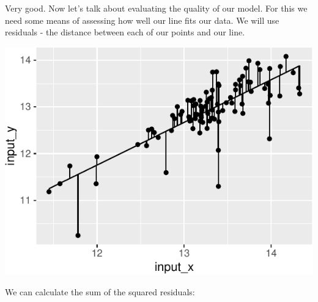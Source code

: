 \documentclass[
]{krantz}
\newenvironment{Shaded}{\begin{snugshade}}{\end{snugshade}}
\newcommand{\AttributeTok}[1]{\textcolor[rgb]{0.77,0.63,0.00}{#1}}
\newcommand{\ConstantTok}[1]{\textcolor[rgb]{0.00,0.00,0.00}{#1}}
\newcommand{\DecValTok}[1]{\textcolor[rgb]{0.00,0.00,0.81}{#1}}
\newcommand{\DocumentationTok}[1]{\textcolor[rgb]{0.56,0.35,0.01}{\textbf{\textit{#1}}}}
\newcommand{\FunctionTok}[1]{\textcolor[rgb]{0.00,0.00,0.00}{#1}}
\newcommand{\NormalTok}[1]{#1}
\newcommand{\SpecialCharTok}[1]{\textcolor[rgb]{0.00,0.00,0.00}{#1}}
\begin{document}
Very good. Now let's talk about evaluating the quality of our model. For this we need some means of assessing how well our line fits our data. We will use residuals - the distance between each of our points and our line.

\begin{Shaded}
\end{Shaded}

\begin{center}\includegraphics[width=0.8\linewidth]{index_files/figure-latex/unnamed-chunk-125-1} \end{center}

We can calculate the sum of the squared residuals:

\begin{Shaded}
\end{Shaded}
\end{document}
